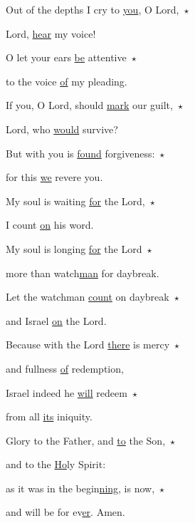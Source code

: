 \noindent Out of the depths I cry to \uline{you}, O Lord,~$\star$~\nopagebreak

Lord, \uline{hear} my voice!

\noindent O let your ears \uline{be} attentive~$\star$~\nopagebreak

to the voice \uline{of} my pleading.

\noindent If you, O Lord, should \uline{mark} our guilt,~$\star$~\nopagebreak

Lord, who \uline{would} survive?

\noindent But with you is \uline{found} forgiveness:~$\star$~\nopagebreak

for this \uline{we} revere you.

\noindent My soul is waiting \uline{for} the Lord,~$\star$~\nopagebreak

I count \uline{on} his word.

\noindent My soul is longing \uline{for} the Lord~$\star$~\nopagebreak

more than watch\uline{man} for daybreak.

\noindent Let the watchman \uline{count} on daybreak~$\star$~\nopagebreak

and Israel \uline{on} the Lord.

\noindent Because with the Lord \uline{there} is mercy~$\star$~\nopagebreak

and fullness \uline{of} redemption,

\noindent Israel indeed he \uline{will} redeem~$\star$~\nopagebreak

from all \uline{its} iniquity.

\noindent Glory to the Father, and \uline{to} the Son,~$\star$~\nopagebreak

and to the \uline{Ho}ly Spirit:

\noindent as it was in the begin\uline{ning}, is now,~$\star$~\nopagebreak

and will be for ev\uline{er}. Amen.